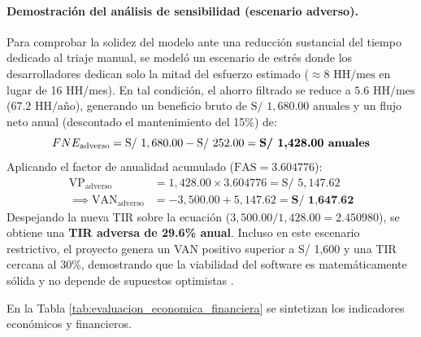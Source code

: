 \paragraph{Demostración del análisis de sensibilidad (escenario adverso).}
Para comprobar la solidez del modelo ante una reducción sustancial del tiempo dedicado al triaje manual, se modeló un escenario de estrés donde los desarrolladores dedican solo la mitad del esfuerzo estimado ($\approx 8\text{ HH/mes}$ en lugar de 16 HH/mes). En tal condición, el ahorro filtrado se reduce a $5.6\text{ HH/mes}$ ($67.2\text{ HH/año}$), generando un beneficio bruto de $\text{S/ } 1,680.00\text{ anuales}$ y un flujo neto anual (descontado el mantenimiento del 15\%) de:
\begin{equation}
    FNE_{\text{adverso}} = \text{S/ } 1,680.00 - \text{S/ } 252.00 = \text{\textbf{S/ 1,428.00 anuales}}
\end{equation}
Aplicando el factor de anualidad acumulado ($\text{FAS} = 3.604776$):
\begin{equation}
\begin{aligned}
    \text{VP}_{\text{adverso}} &= 1{,}428.00 \times 3.604776 = \text{S/ } 5{,}147.62 \\
    \implies \text{VAN}_{\text{adverso}} &= -3{,}500.00 + 5{,}147.62 = \textbf{S/ 1,647.62}
\end{aligned}
\end{equation}
Despejando la nueva TIR sobre la ecuación ($3,500.00/1,428.00 = 2.450980$), se obtiene una \textbf{TIR adversa de 29.6\% anual}. Incluso en este escenario restrictivo, el proyecto genera un VAN positivo superior a S/ 1,600 y una TIR cercana al 30\%, demostrando que la viabilidad del software es matemáticamente sólida y no depende de supuestos optimistas \parencite{torres2026proyecto}. %

En la Tabla \ref{tab:evaluacion_economica_financiera} se sintetizan los indicadores económicos y financieros. %

